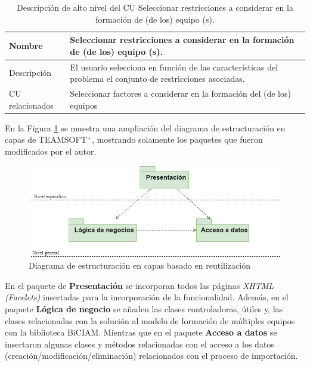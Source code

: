 \begin{table}[H]
	\centering
	\caption{Descripción de alto nivel del CU  Seleccionar restricciones a considerar en la formación de (de los) equipo (s).} \label{table:descripcion-alto-nivel-restricciones}
		\begin{tabular}{ | l | p{10cm} |}
			\toprule
			Nombre          &  Seleccionar restricciones a considerar en la formación de (de los) equipo (s).                                                                                                                      \\ \midrule
			Descripción     & El usuario selecciona en función de las características del problema el conjunto de restricciones asociadas. \\ \hline
			CU relacionados & Seleccionar factores a considerar en la formación del (de los) equipos \\ \bottomrule
		\end{tabular}
\end{table}


En la Figura \ref{fig:diagrama-paquetes-modificado} se muestra una ampliación del diagrama de estructuración en capas de TEAMSOFT$^+$, mostrando solamente los paquetes que  fueron modificados por el autor.

\begin{figure}[H]
	\centering
	\includegraphics[width=.7\textwidth]{figuras/diagrama-paquetes-modificado.png}
	\caption{Diagrama de estructuración en capas basado en reutilización} \label{fig:diagrama-paquetes-modificado}
\end{figure}

En el paquete de \textbf{Presentación} se incorporan todos las páginas \textit{XHTML (Facelets)} insertadas para la incorporación de la funcionalidad. Además, en el paquete \textbf{Lógica de negocio} se añaden las clases controladoras, útiles y, las clases relacionadas con la solución al modelo de formación de múltiples equipos con la biblioteca BiCIAM. Mientras que en el paquete \textbf{Acceso a datos} se insertaron algunas clases y métodos relacionadas con el acceso a los datos (creación/modificación/eliminación) relacionados con el proceso de importación.\\

